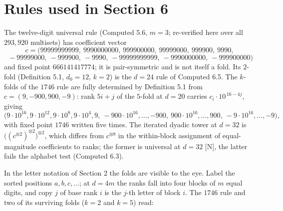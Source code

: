 \documentclass[11pt,letterpaper]{article}
\theoremstyle{paperstyle}
\theoremstyle{paperstyledef}
\theoremstyle{paperstylerem}
\begin{document}
\section{Rules used in Section 6}\label{rules-used-in-section-6}

The twelve-digit universal rule (Computed 5.6, \(m = 3\); re-verified here over all \(293{,}920\) multisets) has coefficient vector \[c = (99999999999,\ 9990000000,\ 999900000,\ 99999000,\ 999900,\ 9990,\] \[\ -99999000,\ -999900,\ -9990,\ -99999999999,\ -9990000000,\ -999900000)\] and fixed point \(666141417774\); it is pair-symmetric and is not itself a fold. Its \(2\)-fold (Definition 5.1, \(d_0 = 12\), \(k = 2\)) is the \(d = 24\) rule of Computed 6.5. The \(k\)-folds of the \(1746\) rule are fully determined by Definition 5.1 from \(c = (9, -900, 900, -9)\): rank \(5i + j\) of the \(5\)-fold at \(d = 20\) carries \(c_i \cdot 10^{\,16 - 4j}\), giving \[\bigl(9\cdot 10^{16}, 9\cdot 10^{12}, 9\cdot 10^{8}, 9\cdot 10^{4}, 9,\ -900\cdot 10^{16}, \dots, -900,\ 900\cdot 10^{16}, \dots, 900,\ -9\cdot 10^{16}, \dots, -9\bigr),\] with fixed point \(1746\) written five times. The iterated dyadic tower at \(d = 32\) is \(\bigl((c^{\otimes 2})^{\otimes 2}\bigr)^{\otimes 2}\), which differs from \(c^{\otimes 8}\) in the within-block assignment of equal-magnitude coefficients to ranks; the former is universal at \(d=32\) {[}N{]}, the latter fails the alphabet test (Computed 6.3).

In the letter notation of Section 2 the folds are visible to the eye. Label the sorted positions \(a, b, c, \dots\); at \(d = 4m\) the ranks fall into four blocks of \(m\) equal digits, and copy \(j\) of base rank \(i\) is the \(j\)-th letter of block \(i\). The \(1746\) rule and two of its surviving folds (\(k = 2\) and \(k = 5\)) read:
\end{document}
